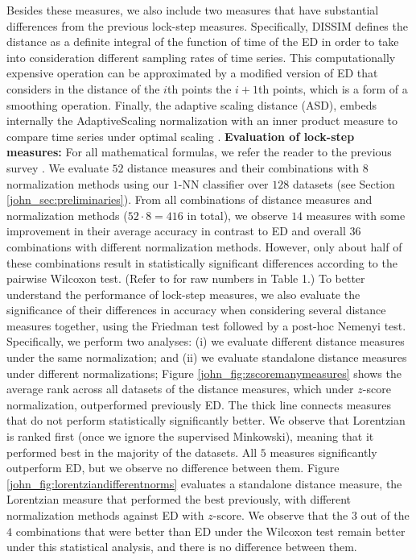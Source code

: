 \documentclass[11pt]{article}
\begin{document}
Besides these measures, we also include two measures that have substantial differences from the previous lock-step measures. Specifically, DISSIM \cite{frentzos2007index} defines the distance as a definite integral of the function of time of the ED in order to take into consideration different sampling rates of time series. This computationally expensive operation can be approximated by a modified version of ED that considers in the distance of the $i$th points the $i+1$th points, which is a form of a smoothing operation. Finally, the adaptive scaling distance (ASD), embeds internally the AdaptiveScaling normalization with an inner product measure to compare time series under optimal scaling \cite{chu1999fast,yang2011patterns}. 
\newline \textbf{Evaluation of lock-step measures: } For all mathematical formulas, we refer the reader to the previous survey \cite{cha2007comprehensive}. We evaluate $52$ distance measures and their combinations with $8$ normalization methods using our $1$-NN classifier over $128$ datasets (see Section \ref{john_sec:preliminaries}). From all combinations of distance measures and normalization methods ($52\cdot8=416$ in total), we observe $14$ measures with some improvement in their average accuracy in contrast to ED and overall $36$ combinations with different normalization methods. However, only about half of these combinations result in statistically significant differences according to the pairwise Wilcoxon test. (Refer to \cite{paparrizos2020debunking} for raw numbers in Table 1.) To better understand the performance of lock-step measures, we also evaluate the significance of their differences in accuracy when considering several distance measures together, using the Friedman test followed by a post-hoc Nemenyi test. Specifically, we perform two analyses: (i) we evaluate different distance measures under the same normalization; and (ii) we evaluate standalone distance measures under different normalizations; Figure \ref{john_fig:zscoremanymeasures} shows the average rank across all datasets of the distance measures, which under $z$-score normalization, outperformed previously ED. The thick line connects measures that do not perform statistically significantly better. We observe that Lorentzian is ranked first (once we ignore the supervised Minkowski), meaning that it performed best in the majority of the datasets. All $5$ measures significantly outperform ED, but we observe no difference between them. Figure \ref{john_fig:lorentziandifferentnorms} evaluates a standalone distance measure, the Lorentzian measure that performed the best previously, with different normalization methods against ED with $z$-score. We observe that the $3$ out of the $4$ combinations that were better than ED under the Wilcoxon test remain better under this statistical analysis, and there is no difference between them.
\end{document}
